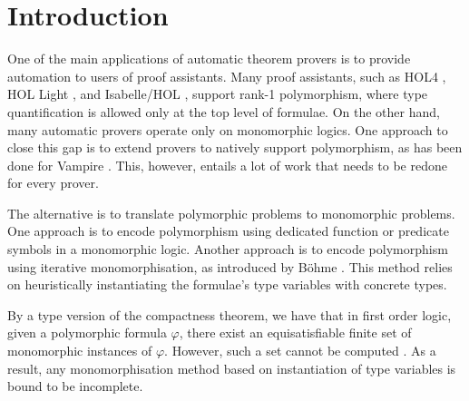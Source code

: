 \documentclass[]{ceurart}
\begin{document}
\maketitle

\section{Introduction}

One of the main applications of automatic theorem provers is to provide automation to users of proof assistants. Many proof assistants, such as HOL4 \cite{slind-norrish-2008}, HOL Light \cite{harrison-2009}, and
Isabelle/HOL \cite{nipkow-et-al-2002}, support rank-1 polymorphism, where type quantification is allowed only at the top level of formulae. On the other hand, many automatic provers operate only on monomorphic logics. One approach to close this gap is to extend provers to natively support polymorphism, as has been done for Vampire \cite{bhayat-reger-2020}. This, however, entails a lot of work that needs to be redone for every prover.


The alternative is to translate polymorphic problems to monomorphic problems. One approach is to encode polymorphism using dedicated function or predicate symbols \cite{mono-trans} in a monomorphic logic. Another approach is to encode polymorphism using {iterative monomorphisation}, as introduced by B\"ohme \cite[Section 2.2.1]{sb-phd}. This method relies on heuristically instantiating the formulae's type variables with concrete types.


By a type version of the compactness theorem, we have that in first order logic, given a polymorphic formula \(\varphi\), there exist an equisatisfiable finite set of monomorphic instances of \(\varphi\). However, such a set cannot be computed \cite[Theorem 1]{expr-poly-types}. As a result, any monomorphisation method based on instantiation of type variables is
bound to be incomplete.
\end{document}

